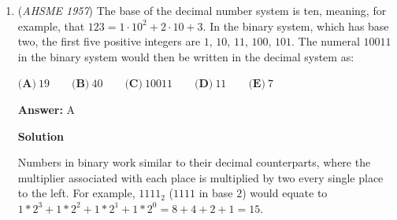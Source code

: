 \begin{enumerate}
 \textbf{Answer: }B



\textbf{Solution 1}

Draw $MB$. Since $\angle AMB$ is inscribed on a diameter, $\angle AMB$ is $90^\circ$. By \href{https://artofproblemsolving.com/wiki/index.php?title=AA\_Similarity}{AA Similarity}, $\triangle APO \sim \triangle ABM$. Setting up ratios, we get $\frac{AP}{AO}=\frac{AB}{AM}$. Cross-multiplying, we get $AP\cdot AM = AO \cdot AB$, so the answer is $\boxed{\textbf{(B)}}$.

 



\textbf{Solution 2}

By \href{https://artofproblemsolving.com/wiki/index.php?title=Thales\%27\_Theorem}{Thales' Theorem}, $\measuredangle PMB = \measuredangle AMB = 90^{\circ}$. Because, from the problem, $\measuredangle POB = 90^{\circ}$ as well, $\measuredangle PMB + \measuredangle POB = 180^{\circ}$, so $PMBO$ is a \href{https://artofproblemsolving.com/wiki/index.php?title=Cyclic\_quadrilateral}{cyclic quadrilateral}. Thus, because $P$, $M$, $O$, and $B$ lie on a circle, we can use \href{https://artofproblemsolving.com/wiki/index.php?title=Power\_of\_a\_Point}{Power of a Point}. From this theorem, we get that $AP \cdot AM = AO \cdot AB$, which is answer choice $\boxed{\textbf{(B)}}$.

 


 


	\item (\textit{AHSME 1957}) The base of the decimal number system is ten, meaning, for example, that $123 = 1\cdot 10^2 + 2\cdot 10 + 3$. 
In the binary system, which has base two, the first five positive integers are $1,\,10,\,11,\,100,\,101$. 
The numeral $10011$ in the binary system would then be written in the decimal system as: 


 $\textbf{(A)}\ 19 \qquad \textbf{(B)}\ 40\qquad \textbf{(C)}\ 10011\qquad \textbf{(D)}\ 11\qquad \textbf{(E)}\ 7$

 \textbf{Answer: }A



\textbf{Solution}

Numbers in binary work similar to their decimal counterparts, where the multiplier associated with each place is multiplied by two every single place to the left. For example, $1111_2$ ($1111$ in base $2$) would equate to $1 * 2^3 + 1 * 2^2 + 1 * 2^1 + 1 * 2^0 = 8+4+2+1 = 15$.


\end{enumerate}
